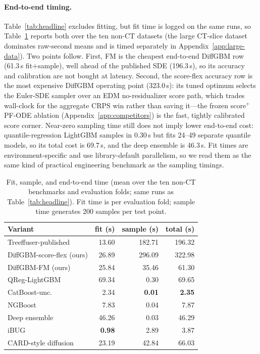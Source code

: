 \documentclass{article}
\begin{document}
\paragraph{End-to-end timing.} Table~\ref{tab:headline} excludes fitting, but fit time is logged on the same runs, so Table~\ref{tab:timing} reports both over the ten non-CT datasets (the large CT-slice dataset dominates raw-second means and is timed separately in Appendix~\ref{app:large-data}). Two points follow. First, FM is the cheapest end-to-end DiffGBM row (61.3\,s fit$+$sample), well ahead of the published SDE (196.3\,s), so its accuracy and calibration are not bought at latency. Second, the score-flex accuracy row is the most expensive DiffGBM operating point (323.0\,s): its tuned optimum selects the Euler-SDE sampler over an EDM no-residualizer score path, which trades wall-clock for the aggregate CRPS win rather than saving it---the frozen score$^+$ PF-ODE ablation (Appendix~\ref{app:competitors}) is the fast, tightly calibrated score corner. Near-zero sampling time still does not imply lower end-to-end cost: quantile-regression LightGBM samples in 0.30\,s but fits 24--49 separate quantile models, so its total cost is 69.7\,s, and the deep ensemble is 46.3\,s. Fit times are environment-specific and use library-default parallelism, so we read them as the same kind of practical engineering benchmark as the sampling timings.

\begin{table}[!t]
  \centering
  \caption{Fit, sample, and end-to-end time (mean over the ten non-CT benchmarks and evaluation folds; same runs as Table~\ref{tab:headline}). Fit time is per evaluation fold; sample time generates 200 samples per test point.}\label{tab:timing}
  \scriptsize
  \begin{tabular}{lrrr}
    \toprule
    Variant & fit (s) & sample (s) & total (s) \\
    \midrule
    Treeffuser-published & 13.60 & 182.71 & 196.32 \\
    DiffGBM-score-flex (ours) & 26.89 & 296.09 & 322.98 \\
    DiffGBM-FM (ours) & 25.84 & 35.46 & 61.30 \\
    \midrule
    QReg-LightGBM & 69.34 & 0.30 & 69.65 \\
    CatBoost-unc. & 2.34 & \textbf{0.01} & \textbf{2.35} \\
    NGBoost & 7.83 & 0.04 & 7.87 \\
    Deep ensemble & 46.26 & 0.03 & 46.29 \\
    iBUG & \textbf{0.98} & 2.89 & 3.87 \\
    CARD-style diffusion & 23.19 & 42.84 & 66.03 \\
    \bottomrule
  \end{tabular}
\end{table}
\end{document}

